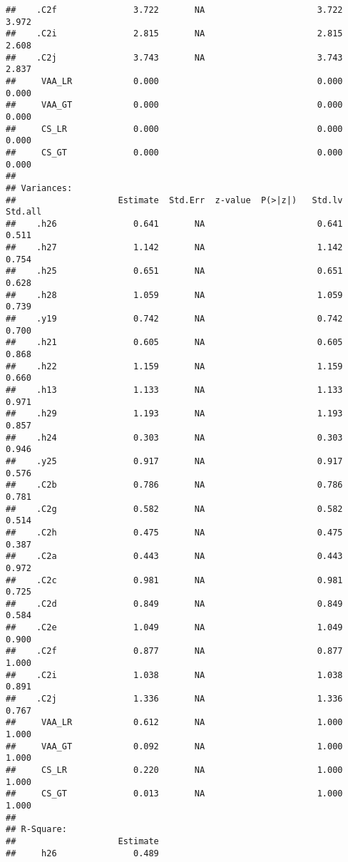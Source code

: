 \documentclass[
]{article}
\begin{document}
\begin{verbatim}
##    .C2f               3.722       NA                      3.722    3.972
##    .C2i               2.815       NA                      2.815    2.608
##    .C2j               3.743       NA                      3.743    2.837
##     VAA_LR            0.000                               0.000    0.000
##     VAA_GT            0.000                               0.000    0.000
##     CS_LR             0.000                               0.000    0.000
##     CS_GT             0.000                               0.000    0.000
## 
## Variances:
##                    Estimate  Std.Err  z-value  P(>|z|)   Std.lv  Std.all
##    .h26               0.641       NA                      0.641    0.511
##    .h27               1.142       NA                      1.142    0.754
##    .h25               0.651       NA                      0.651    0.628
##    .h28               1.059       NA                      1.059    0.739
##    .y19               0.742       NA                      0.742    0.700
##    .h21               0.605       NA                      0.605    0.868
##    .h22               1.159       NA                      1.159    0.660
##    .h13               1.133       NA                      1.133    0.971
##    .h29               1.193       NA                      1.193    0.857
##    .h24               0.303       NA                      0.303    0.946
##    .y25               0.917       NA                      0.917    0.576
##    .C2b               0.786       NA                      0.786    0.781
##    .C2g               0.582       NA                      0.582    0.514
##    .C2h               0.475       NA                      0.475    0.387
##    .C2a               0.443       NA                      0.443    0.972
##    .C2c               0.981       NA                      0.981    0.725
##    .C2d               0.849       NA                      0.849    0.584
##    .C2e               1.049       NA                      1.049    0.900
##    .C2f               0.877       NA                      0.877    1.000
##    .C2i               1.038       NA                      1.038    0.891
##    .C2j               1.336       NA                      1.336    0.767
##     VAA_LR            0.612       NA                      1.000    1.000
##     VAA_GT            0.092       NA                      1.000    1.000
##     CS_LR             0.220       NA                      1.000    1.000
##     CS_GT             0.013       NA                      1.000    1.000
## 
## R-Square:
##                    Estimate
##     h26               0.489

\end{verbatim}
\end{document}
